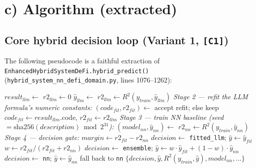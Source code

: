 \documentclass[11pt,a4paper]{article}
\newcommand{\code}[1]{\texttt{\small #1}}
\begin{document}
\section{c) Algorithm (extracted)}

\subsection{Core hybrid decision loop (Variant 1, \code{[C1]})}
The following pseudocode is a faithful extraction of
\code{EnhancedHybridSystemDeFi.hybrid\_predict()}
(\code{hybrid\_system\_nn\_defi\_domain.py}, lines 1076--1262):

\begin{algorithm}[H]
\caption{\code{hybrid\_predict}(description, domain, $X_{train}$, $y_{train}$, vars, meta)}
\begin{algorithmic}[1]
\State $result_{llm} \gets$ 
\State $r2_{llm} \gets 0$
    \State $\hat{y}_{llm} \gets$ 
     \State $r2_{llm} \gets R^2(y_{train}, \hat{y}_{llm})$ \EndIf
\EndIf
\Statex \textit{Stage 2 --- refit the LLM formula's numeric constants:}
\State $(code_{fit}, r2_{fit}) \gets$ 
 \State accept refit; else keep $code_{fit} \gets result_{llm}$.code, $r2_{fit}\gets r2_{llm}$
\EndIf
\Statex \textit{Stage 3 --- train NN baseline (seed $= \mathrm{sha256}(description) \bmod 2^{31}$):}
\State $(model_{nn}, \hat{y}_{nn}) \gets$ 
\State $r2_{nn} \gets R^2(y_{train}, \hat{y}_{nn})$
\Statex \textit{Stage 4 --- decision gate:}
\State $margin \gets r2_{fit} - r2_{nn}$
    \State $decision \gets$ \texttt{fitted\_llm}; \quad $\hat{y} \gets \hat{y}_{fit}$
    \State $w \gets r2_{fit}/(r2_{fit}+r2_{nn})$
    \State $decision \gets$ \texttt{ensemble}; \quad $\hat{y} \gets w\cdot\hat{y}_{fit} + (1-w)\cdot\hat{y}_{nn}$
\Else
    \State $decision \gets$ \texttt{nn}; \quad $\hat{y}\gets \hat{y}_{nn}$
\EndIf
{} \State fall back to \texttt{nn} \EndIf
\State \Return $\{decision, \hat{y}, R^2(y_{train},\hat{y}), model_{nn}, \dots\}$
\end{algorithmic}
\end{algorithm}
\end{document}
